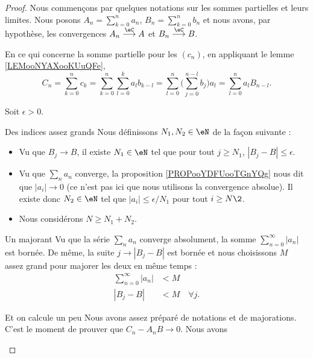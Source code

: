 \begin{proof}
	Nous commençons par quelques notations sur les sommes partielles et leurs limites. Nous posons \( A_n=\sum_{k=0}^na_n\), \( B_n=\sum_{k=0}^nb_n\) et nous avons, par hypothèse, les convergences \( A_n\stackrel{\eC}{\longrightarrow}A\) et \( B_n\stackrel{\eC}{\longrightarrow}B\).

	En ce qui concerne la somme partielle pour les \( (c_n)\), en appliquant le lemme \ref{LEMooNYAXooKUuQFe},
	\begin{equation}
		C_n=\sum_{k=0}^nc_k=\sum_{k=0}^n\sum_{l=0}^ka_lb_{k-l}=\sum_{l=0}^n\big( \sum_{j=0}^{n-l}b_j \big)a_l=\sum_{l=0}^na_lB_{n-l}.
	\end{equation}

	Soit \( \epsilon>0\).
	\begin{subproof}
		\item[Des indices assez grands]
		Nous définissons \( N_1, N_2\in \eN\) de la façon suivante :
		\begin{itemize}
			\item
			      Vu que \( B_j\to B\), il existe \( N_1\in \eN\) tel que pour tout \( j\geq N_1\), \( | B_j-B |\leq \epsilon\).
			\item
			      Vu que \( \sum_na_n\) converge, la proposition \ref{PROPooYDFUooTGnYQg} nous dit que \( | a_i |\to 0\) (ce n'est pas ici que nous utilisons la convergence absolue). Il existe donc \( N_2\in \eN\) tel que \( | a_i |\leq \epsilon/N_1\) pour tout \( i\geq N\2\).
			\item
			      Nous considérons \( N\geq N_1+N_2\).
		\end{itemize}
		\item[Un majorant]
		Vu que la série \( \sum_na_n\) converge absolument, la somme \( \sum_{n=0}^{\infty}| a_n |\) est bornée. De même, la suite \( j\to| B_j-B |\) est bornée et nous choisissons \( M\) assez grand pour majorer les deux en même temps :
		\begin{subequations}
			\begin{align}
				\sum_{n=0}^{\infty}| a_n | & <M           \label{SUBEQooBKCVooXnampA} \\
				| B_j-B |                  & <M\quad \forall j.
			\end{align}
		\end{subequations}
		\item[Et on calcule un peu]
		Nous avons assez préparé de notations et de majorations. C'est le moment de prouver que \( C_n-A_nB \to 0\). Nous avons
		\begin{subequations}

\end{subequations}
\end{subproof}
\end{proof}
